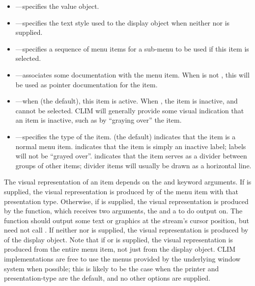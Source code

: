 \begin{itemize}
\item {}---specifies the value object.

\item {}---specifies the text style used to  the display
object when neither  nor  is supplied.

\item {}---specifies a sequence of menu items for a sub-menu to be used
if this item is selected.
 
\item {}---associates some documentation with the menu item.
When  is not , this will be used as pointer
documentation for the item.

\item {}---when  (the default), this item is active.  When
, the item is inactive, and cannot be selected.  CLIM will generally
provide some visual indication that an item is inactive, such as by ``graying
over'' the item.

\item {}---specifies the type of the item.   (the default)
indicates that the item is a normal menu item.   indicates that the
item is simply an inactive label; labels will not be ``grayed over''.
 indicates that the item serves as a divider between groups of
other items; divider items will usually be drawn as a horizontal line.
\end{itemize}

The visual representation of an item depends on the  and
 keyword arguments.  If  is
supplied, the visual representation is produced by  of the menu item
with that presentation type.  Otherwise, if  is supplied, the visual
representation is produced by the  function, which receives two
arguments, the  and a  to do output on.  The 
function should output some text or graphics at the stream's cursor position, but
need not call .  If neither  nor 
is supplied, the visual representation is produced by  of the display
object.  Note that if  or  is supplied, the
visual representation is produced from the entire menu item, not just from the
display object.  CLIM implementations are free to use the menus provided by the
underlying window system when possible; this is likely to be the case when the
printer and presentation-type are the default, and no other options are supplied.

